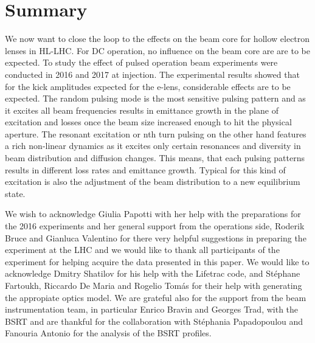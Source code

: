\documentclass[%
 reprint,
 amsmath,amssymb,
 aps,
prstab,
]{revtex4-1}
\begin{document}
\section{Summary\label{sec:sum}}
We now want to close the loop to the effects on the beam core for hollow electron lenses in HL-LHC. For DC operation, no influence on the beam core are are to be expected. To study the effect of pulsed operation beam experiments were conducted in 2016 and 2017 at injection. The experimental results showed that for the kick amplitudes expected for the e-lens, considerable effects are to be expected. The random pulsing mode is the most sensitive pulsing pattern and as it excites all beam frequencies results in emittance growth in the plane of excitation and losses once the beam size increased enough to hit the physical aperture. The resonant excitation or nth turn pulsing on the other hand features a rich non-linear dynamics as it excites only certain resonances and diversity in beam distribution and diffusion changes. This means, that each pulsing patterns results in different loss rates and emittance growth. Typical for this kind of excitation is also the adjustment of the beam distribution to a new equilibrium state.


\begin{acknowledgments}
We wish to acknowledge Giulia Papotti with her help with the preparations for the 2016 experiments and her general support from the operations side, Roderik Bruce and Gianluca Valentino for there very helpful suggestions in preparing the experiment at the LHC and we would like to thank all participants of the experiment for helping acquire the data presented in this paper. We would like to acknowledge Dmitry Shatilov for his help with the Lifetrac code, and St\'{e}phane Fartoukh, Riccardo De Maria and Rogelio Tomás for their help with generating the appropiate optics model. We are grateful also for the support from the beam instrumentation team, in particular Enrico Bravin and Georges Trad, with the BSRT and are thankful for the collaboration with St\'{e}phania Papadopoulou and Fanouria Antonio for the analysis of the BSRT profiles.
\end{acknowledgments}

\clearpage

\appendix
\end{document}
